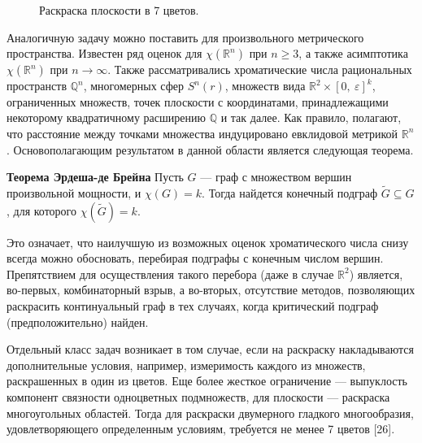 \begin{figure}[h]
\centering
\captionsetup{justification=centering}
\caption{Раскраска плоскости в 7 цветов.}
\label{introduction:fig:plane}
\end{figure}

Аналогичную задачу можно поставить для произвольного метрического пространства. Известен ряд оценок для $\chi(\mathbb{R}^n)$ при $n \ge 3$, а также асимптотика $\chi(\mathbb{R}^n)$ при $n\to\infty$. 
Также рассматривались хроматические числа рациональных пространств $\mathbb{Q}^n$, многомерных сфер $S^n(r)$, 
множеств вида $\mathbb{R}^2 \times \left[ 0,~\varepsilon \right]^{k}$, ограниченных множеств, точек плоскости с координатами, принадлежащими некоторому квадратичному расширению $\mathbb{Q}$ и так далее. Как правило, полагают, что расстояние между точками множества индуцировано евклидовой метрикой $\mathbb{R}^n$. Основополагающим результатом в данной области является следующая теорема.

\textbf{Теорема Эрдеша-де Брейна} Пусть $G$ — граф с множеством вершин произвольной мощности, и $\chi(G) = k$. Тогда найдется конечный подграф  $\widetilde{G} \subseteq G$, для которого $\chi(\widetilde{G}) = k$. 

Это означает, что наилучшую из возможных оценок хроматического числа снизу всегда можно обосновать, перебирая подграфы с конечным числом вершин. Препятствием для осуществления такого перебора (даже в случае $\mathbb{R}^2$) является, во-первых, комбинаторный взрыв, а во-вторых, отсутствие методов, позволяющих раскрасить континуальный граф в тех случаях, когда критический подграф (предположительно) найден.

Отдельный класс задач возникает в том случае, если на раскраску накладываются дополнительные условия, например, измеримость каждого из множеств, раскрашенных в один из цветов. Еще более жесткое ограничение — выпуклость компонент связности одноцветных подмножеств, для плоскости — раскраска многоугольных областей. Тогда для раскраски двумерного гладкого многообразия, удовлетворяющего определенным условиям, требуется не менее 7 цветов [26].